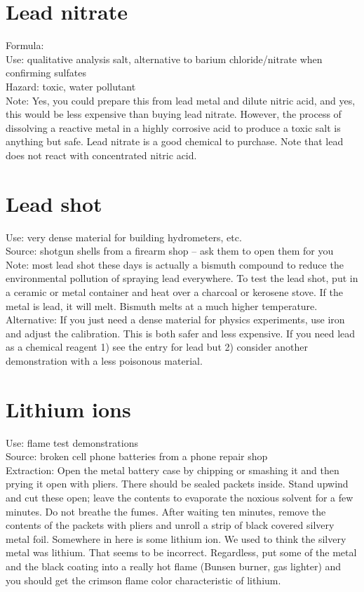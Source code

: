 \section{Lead nitrate}
\label{sec:}
Formula: \\
Use: qualitative analysis salt, 
alternative to barium chloride/nitrate when confirming sulfates\\
Hazard: toxic, 
water pollutant\\
Note: Yes, 
you could prepare this from lead metal and dilute nitric acid, 
and yes, 
this would be less expensive than buying lead nitrate. 
However, 
the process of dissolving a reactive metal in a highly corrosive acid 
to produce a toxic salt is anything but safe. 
Lead nitrate is a good chemical to purchase. 
Note that lead does not react with concentrated nitric acid.

\section{Lead shot}
\label{sec:}
Use: very dense material for building hydrometers, 
etc.\\
Source: shotgun shells from a firearm shop -- 
ask them to open them for you\\
Note: most lead shot these days is actually a bismuth compound 
to reduce the environmental pollution of spraying lead everywhere. 
To test the lead shot, 
put in a ceramic or metal container 
and heat over a charcoal or kerosene stove. 
If the metal is lead, 
it will melt. 
Bismuth melts at a much higher temperature.\\
Alternative: If you just need a dense material for physics experiments, 
use iron and adjust the calibration. 
This is both safer and less expensive. 
If you need lead as a chemical reagent 
1) see the entry for lead but 
2) consider another demonstration with a less poisonous material.

\section{Lithium ions}
\label{sec:}
Use: flame test demonstrations\\
Source: broken cell phone batteries from a phone repair shop\\
Extraction: Open the metal battery case by chipping 
or smashing it and then prying it open with pliers. 
There should be sealed packets inside. 
Stand upwind and cut these open; 
leave the contents to evaporate the noxious solvent for a few minutes. 
Do not breathe the fumes. 
After waiting ten minutes, 
remove the contents of the packets with pliers 
and unroll a strip of black covered silvery metal foil. 
Somewhere in here is some lithium ion. 
We used to think the silvery metal was lithium. 
That seems to be incorrect. 
Regardless, put some of the metal and the black coating
into a really hot flame (Bunsen burner, gas lighter)
and you should get the crimson flame color
characteristic of lithium.

